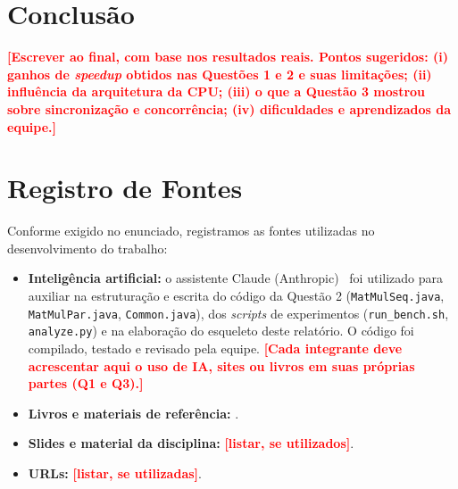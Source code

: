 \documentclass[12pt]{article}
\newcommand{\todo}[1]{\textcolor{red}{\textbf{[#1]}}}
\begin{document}
\section{Conclusão}
\label{sec:conclusao}

\todo{Escrever ao final, com base nos resultados reais. Pontos sugeridos: (i) ganhos de \textit{speedup} obtidos nas Questões 1 e 2 e suas limitações; (ii) influência da arquitetura da CPU; (iii) o que a Questão 3 mostrou sobre sincronização e concorrência; (iv) dificuldades e aprendizados da equipe.}

\section{Registro de Fontes}
\label{sec:fontes}

Conforme exigido no enunciado, registramos as fontes utilizadas no desenvolvimento do trabalho:

\begin{itemize}
  \item \textbf{Inteligência artificial:} o assistente Claude (Anthropic)~\cite{claude} foi utilizado para auxiliar na estruturação e escrita do código da Questão 2 (\texttt{MatMulSeq.java}, \texttt{MatMulPar.java}, \texttt{Common.java}), dos \textit{scripts} de experimentos (\texttt{run\_bench.sh}, \texttt{analyze.py}) e na elaboração do esqueleto deste relatório. O código foi compilado, testado e revisado pela equipe. \todo{Cada integrante deve acrescentar aqui o uso de IA, sites ou livros em suas próprias partes (Q1 e Q3).}
  \item \textbf{Livros e materiais de referência:} \cite{tanenbaum2014,silberschatz2018,pacheco2011,goetz2006,oracle-concurrency}.
  \item \textbf{Slides e material da disciplina:} \todo{listar, se utilizados}.
  \item \textbf{URLs:} \todo{listar, se utilizadas}.
\end{itemize}



\end{document}
